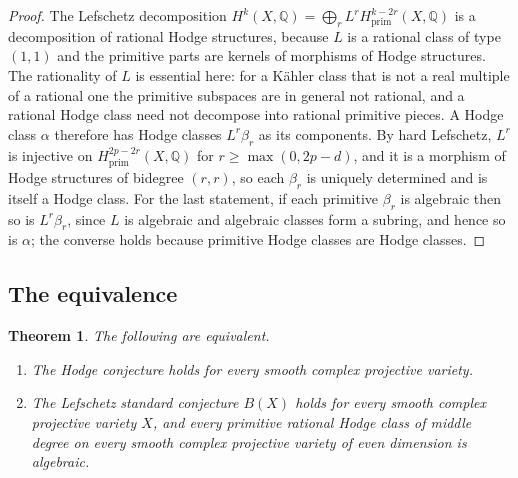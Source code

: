 \documentclass[11pt,reqno]{amsart}
\theoremstyle{plain}
\newtheorem{theorem}{Theorem}[section]
\theoremstyle{definition}
\theoremstyle{remark}
\newcommand{\QQ}{\mathbb{Q}}
\begin{document}
\begin{proof}
The Lefschetz decomposition
$H^{k}(X,\QQ)=\bigoplus_{r}L^{r}H^{k-2r}_{\mathrm{prim}}(X,\QQ)$ is a
decomposition of rational Hodge structures, because $L$ is a rational class
of type $(1,1)$ and the primitive parts are kernels of morphisms of Hodge
structures. The rationality of $L$ is essential here: for a K\"ahler class
that is not a real multiple of a rational one the primitive subspaces are in
general not rational, and a rational Hodge class need not decompose into
rational primitive pieces. A Hodge class $\alpha$ therefore has Hodge classes
$L^{r}\beta_{r}$ as its components. By hard Lefschetz, $L^{r}$ is injective
on $H^{2p-2r}_{\mathrm{prim}}(X,\QQ)$ for $r\ge\max(0,2p-d)$, and it is a
morphism of Hodge structures of bidegree $(r,r)$, so each $\beta_{r}$ is
uniquely determined and is itself a Hodge class. For the last statement, if
each primitive $\beta_{r}$ is algebraic then so is $L^{r}\beta_{r}$, since $L$
is algebraic and algebraic classes form a subring, and hence so is $\alpha$;
the converse holds because primitive Hodge classes are Hodge classes.
\end{proof}

\subsection{The equivalence}

\begin{theorem}\label{thm:equivalence}
The following are equivalent.
\begin{enumerate}[label=\textup{(\roman*)}]
\item The Hodge conjecture holds for every smooth complex projective variety.
\item The Lefschetz standard conjecture $B(X)$ holds for every smooth complex
  projective variety $X$, and every primitive rational Hodge class of middle
  degree on every smooth complex projective variety of even dimension is
  algebraic.
\end{enumerate}
\end{theorem}
\end{document}

